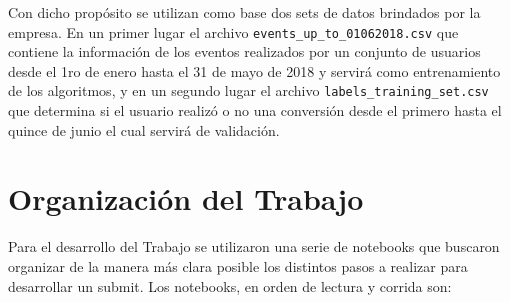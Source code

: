 \documentclass[a4paper]{article}
\begin{document}
Con dicho propósito se utilizan como base dos sets de datos brindados por la empresa. En un primer lugar el archivo \texttt{events\_up\_to\_01062018.csv} que contiene la información de los eventos realizados por un conjunto de usuarios desde el 1ro de enero hasta el 31 de mayo de 2018 y servirá como entrenamiento de los algoritmos, y en un segundo lugar el archivo \texttt{labels\_training\_set.csv} que determina si el usuario realizó o no una conversión desde el primero hasta el quince de junio el cual servirá de validación. 

\section{Organización del Trabajo}

Para el desarrollo del Trabajo se utilizaron una serie de notebooks que buscaron organizar de la manera más clara posible los distintos pasos a realizar para desarrollar un submit. Los notebooks, en orden de lectura y corrida son:
\end{document}

